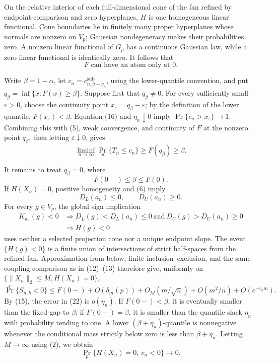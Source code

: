 On the relative interior of each full-dimensional cone of the fan refined by endpoint-comparison and zero hyperplanes, \(H\) is one homogeneous linear functional. Cone boundaries lie in finitely many proper hyperplanes whose normals are nonzero on \(V_p\); Gaussian nondegeneracy makes their probabilities zero. A nonzero linear functional of \(G_p\) has a continuous Gaussian law, while a zero linear functional is identically zero. It follows that
\[
F\text{ can have an atom only at }0.
\tag{17}
\]

Write \(\beta=1-\alpha\), let \(c_n=c^{\mathrm{sub}}_{n,\beta+\eta_n}\), using the lower-quantile convention, and put \(q_\beta=\inf\{x:F(x)\geq\beta\}\). Suppose first that \(q_\beta\neq0\). For every sufficiently small \(\varepsilon>0\), choose the continuity point \(x_\varepsilon=q_\beta-\varepsilon\); by the definition of the lower quantile, \(F(x_\varepsilon)<\beta\). Equation (16) and \(\eta_n\downarrow0\) imply \(\Pr\{c_n>x_\varepsilon\}\to1\). Combining this with (5), weak convergence, and continuity of \(F\) at the nonzero point \(q_\beta\), then letting \(\varepsilon\downarrow0\), gives
\[
\liminf_{n\to\infty}\Pr_p\{T_n\leq c_n\}
\geq F(q_\beta)\geq\beta.
\tag{18}
\]

It remains to treat \(q_\beta=0\), where
\[
F(0-)\leq\beta\leq F(0).
\tag{19}
\]
If \(H(X_n)=0\), positive homogeneity and (6) imply
\[
D_L(a_n)\leq0,
\qquad
D_U(a_n)\geq0.
\tag{20}
\]
For every \(g\in V_p\), the global sign implication
\[
\begin{aligned}
K_{a_n}(g)<0
&\Longrightarrow D_L(g)<D_L(a_n)\leq0
\ \text{and}\ D_U(g)>D_U(a_n)\geq0\\
&\Longrightarrow H(g)<0
\end{aligned}
\tag{21}
\]
uses neither a selected projection cone nor a unique endpoint slope. The event \(\{H(g)<0\}\) is a finite union of intersections of strict half-spaces from the refined fan. Approximation from below, finite inclusion--exclusion, and the same coupling comparison as in (12)--(13) therefore give, uniformly on \(\{\|X_n\|_2\leq M,H(X_n)=0\}\),
\[
\Pr^*\{S_{n,b}<0\}
\leq F(0-)+O(\delta_m(p))+O_M(m/\sqrt n)
+O(m^2/n)+O(e^{-c_0m}).
\tag{22}
\]
By (15), the error in (22) is \(o(\eta_n)\). If \(F(0-)<\beta\), it is eventually smaller than the fixed gap to \(\beta\); if \(F(0-)=\beta\), it is smaller than the quantile slack \(\eta_n\) with probability tending to one. A lower \((\beta+\eta_n)\)-quantile is nonnegative whenever the conditional mass strictly below zero is less than \(\beta+\eta_n\). Letting \(M\to\infty\) using (2), we obtain
\[
\Pr_p\{H(X_n)=0,\ c_n<0\}\longrightarrow0.
\tag{23}
\]

